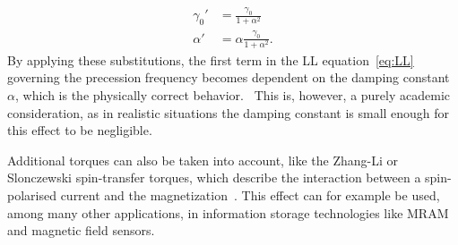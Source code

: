 \documentclass[11pt,a4paper,english]{article}
\begin{document}
\begin{align*}
    \gamma_0' &= \frac{\gamma_0}{1+\alpha^2} \\
    \alpha' &= \alpha \frac{\gamma_0}{1+\alpha^2} \mathrm{.}
\end{align*}
By applying these substitutions, the first term in the LL equation~\eqref{eq:LL} governing the precession frequency becomes dependent on the damping constant $\alpha$, which is the physically correct behavior.~\cite{phd_leliaert} This is, however, a purely academic consideration, as in realistic situations the damping constant is small enough for this effect to be negligible. \par
Additional torques can also be taken into account, like the Zhang-Li or Slonczewski spin-transfer torques, which describe the interaction between a spin-polarised current and the magnetization~\cite{ZhangLiSpinTransferTorque, MuMax3, syllabus_PoAEaPD}. This effect can for example be used, among many other applications, in information storage technologies like MRAM and magnetic field sensors.~\cite{syllabus_PoAEaPD}
\end{document}
